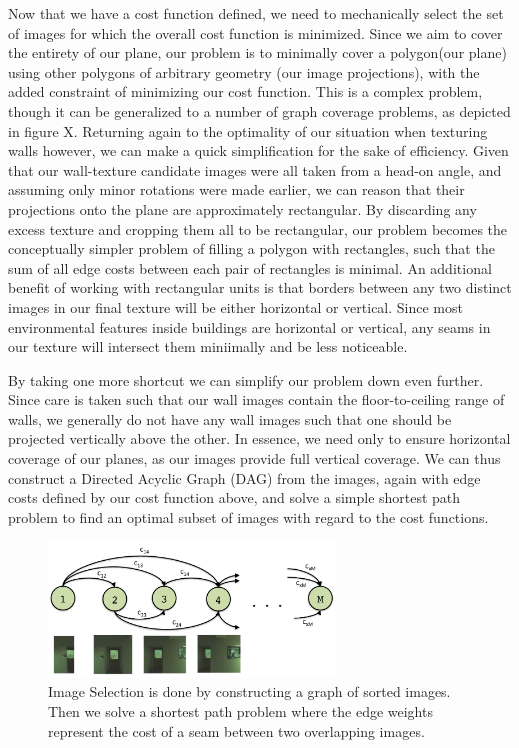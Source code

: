 \documentclass[10pt,twocolumn,letterpaper]{article}
\begin{document}
Now that we have a cost function defined, we need to mechanically
select the set of images for which the overall cost function is
minimized. Since we aim to cover the entirety of our plane, our
problem is to minimally cover a polygon(our plane) using other
polygons of arbitrary geometry (our image projections), with the added
constraint of minimizing our cost function. This is a complex problem,
though it can be generalized to a number of graph coverage problems,
as depicted in figure X. Returning again to the optimality of our
situation when texturing walls however, we can make a quick
simplification for the sake of efficiency. Given that our wall-texture
candidate images were all taken from a head-on angle, and assuming
only minor rotations were made earlier, we can reason that their
projections onto the plane are approximately rectangular. By
discarding any excess texture and cropping them all to be rectangular,
our problem becomes the conceptually simpler problem of filling a
polygon with rectangles, such that the sum of all edge costs between
each pair of rectangles is minimal. An additional benefit of working
with rectangular units is that borders between any two distinct images
in our final texture will be either horizontal or vertical. Since most
environmental features inside buildings are horizontal or vertical,
any seams in our texture will intersect them miniimally and be less
noticeable.

By taking one more shortcut we can simplify our problem down even
further. Since care is taken such that our wall images contain the
floor-to-ceiling range of walls, we generally do not have any wall
images such that one should be projected vertically above the
other. In essence, we need only to ensure horizontal coverage of our
planes, as our images provide full vertical coverage. We can thus
construct a Directed Acyclic Graph (DAG) from the images, again with
edge costs defined by our cost function above, and solve a simple
shortest path problem to find an optimal subset of images with regard
to the cost functions.

\begin{figure}
  \centering
  \includegraphics[width=3in]{DynProg.pdf}
  \caption{Image Selection is done by constructing a graph of sorted
    images. Then we solve a shortest path problem where the edge
    weights represent the cost of a seam between two overlapping
    images.}
  \label{fig:DynProg}
\end{figure}
\end{document}
